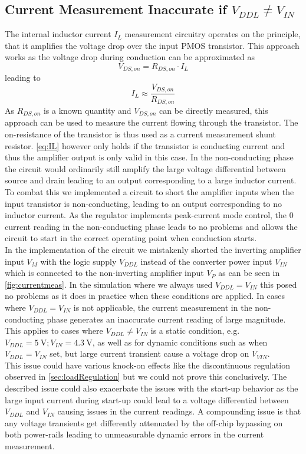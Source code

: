 \subsection{Current Measurement Inaccurate if $V_{DDL} \neq V_{IN}$}
\label{subsubsec:cur_mes_inac}
The internal inductor current $I_L$ measurement circuitry operates on the principle, that it amplifies the voltage drop over the input PMOS transistor. This approach works as the voltage drop during conduction can be approximated as 
\begin{equation}
    V_{DS,on} = R_{DS,on} \cdot I_L
\end{equation}
\label{eq:Vds}
leading to 
\begin{equation}
    I_L \approx \frac{V_{DS,on}}{R_{DS,on}}
\end{equation}
\label{eq:IL}
As $R_{DS,on}$ is a known quantity and $V_{DS,on}$ can be directly measured, this approach can be used to measure the current flowing through the transistor.
The on-resistance of the transistor is thus used as a current measurement shunt resistor. \autoref{eq:IL} however only holds if the transistor is conducting current and thus the amplifier output is only valid in this case. In the non-conducting phase the circuit would ordinarily still amplify the large voltage differential between source and drain leading to an output corresponding to a large inductor current. To combat this we implemented a circuit to short the amplifier inputs when the input transistor is non-conducting, leading to an output corresponding to no inductor current. As the regulator implements peak-current mode control, the 0 current reading in the non-conducting phase leads to no problems and allows the circuit to start in the correct operating point when conduction starts. \\
In the implementation of the circuit we mistakenly shorted the inverting amplifier input $V_M$ with the logic supply $V_{DDL}$ instead of the converter power input $V_{IN}$ which is connected to the non-inverting amplifier input $V_P$ as can be seen in \autoref{fig:currentmeas}. In the simulation where we always used $V_{DDL} = V_{IN}$ this posed no problems as it does in practice when these conditions are applied. In cases where $V_{DDL} = V_{IN}$ is not applicable, the current measurement in the non-conducting phase generates an inaccurate current reading of large magnitude. This applies to cases where $V_{DDL} \neq V_{IN}$ is a static condition, e.g. $V_{DDL} = \qty{5}{\volt}; V_{IN}= \qty{4.3}{\volt}$, as well as for dynamic conditions such as when $V_{DDL} = V_{IN}$ set, but large current transient cause a voltage drop on $V_{VIN}$.\\
This issue could have various knock-on effects like the discontinuous regulation observed in \autoref{sec:loadRegulation} but we could not prove this conclusively. The described issue could also exacerbate the issues with the start-up behavior as the large input current during start-up could lead to a voltage differential between $V_{DDL}$ and $V_{IN}$ causing issues in the current readings. A compounding issue is that any voltage transients get differently attenuated by the off-chip bypassing on both power-rails leading to unmeasurable dynamic errors in the current measurement.

